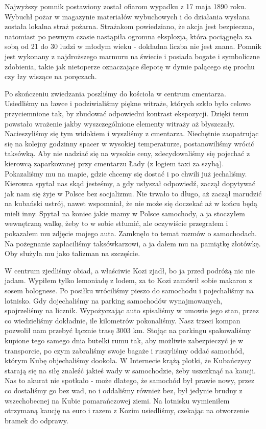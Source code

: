 Najwyższy pomnik postawiony został ofiarom wypadku z 17 maja 1890 roku.
Wybuchł pożar w magazynie materiałów wybuchowych i do działania wysłana została lokalna straż pożarna.
Strażakom powiedziano, że akcja jest bezpieczna, natomiast po pewnym czasie nastąpiła ogromna eksplozja, która pociągnęła za sobą od 21 do 30 ludzi w młodym wieku - dokładna liczba nie jest znana.
Pomnik jest wykonany z najdroższego marmuru na świecie i posiada bogate i symboliczne zdobienia, takie jak nietoperze oznaczające ślepotę w dymie palącego się prochu czy łzy wiszące na poręczach.
\par Po skończeniu zwiedzania poszliśmy do kościoła w centrum cmentarza.
Usiedliśmy na ławce i podziwialiśmy piękne witraże, których szkło było celowo przyciemnione tak, by zbudować odpowiedni kontrast ekspozycji.
Dzięki temu powstało wrażenie jakby wyszczególnione elementy witraży aż błyszczały.
Nacieszyliśmy się tym widokiem i wyszliśmy z cmentarza.
Niechętnie zaopatrując się na kolejny godzinny spacer w wysokiej temperaturze, postanowiliśmy wrócić taksówką.
Aby nie nadziać się na wysokie ceny, zdecydowaliśmy się pojechać z kierowcą zaparkowanej przy cmentarzu Łady (z logiem taxi za szybą).
Pokazaliśmy mu na mapie, gdzie chcemy się dostać i po chwili już jechaliśmy.
Kierowca spytał nas skąd jesteśmy, a gdy usłyszał odpowiedź, zaczął dopytywać jak nam się żyje w Polsce bez socjalizmu.
Nie trwało to długo, aż zaczął marudzić na kubański ustrój, nawet wspomniał, że nie może się doczekać aż w końcu będą mieli inny.
Spytał na koniec jakie mamy w Polsce samochody, a ja stoczyłem wewnętrzną walkę, żeby to w sobie stłumić, ale oczywiście przegrałem i pokazałem mu zdjęcie mojego auta.
Zamknęło to temat rozmów o samochodach.
Na pożegnanie zapłaciliśmy taksówkarzowi, a ja dałem mu na pamiątkę złotówkę.
Oby służyła mu jako talizman na szczęście.
\par W centrum zjedliśmy obiad, a właściwie Kozi zjadł, bo ja przed podróżą nic nie jadam.
Wypiłem tylko lemoniadę z lodem, za to Kozi zamówił sobie makaron z sosem bolognese.
Po posiłku wróciliśmy pieszo do samochodu i pojechaliśmy na lotnisko.
Gdy dojechaliśmy na parking samochodów wynajmowanych, spojrzeliśmy na licznik. Wypożyczając auto spisaliśmy w umowie jego stan, przez co wiedzieliśmy dokładnie, ile kilometrów pokonaliśmy. Nasz trzeci kompan pozwolił nam przebyć łącznie trasę 3003 km.
Stojąc na parkingu spakowaliśmy kupione tego samego dnia butelki rumu tak, aby możliwie zabezpieczyć je w transporcie, po czym zabraliśmy swoje bagaże i ruszyliśmy oddać samochód, którym Kubę objechaliśmy dookoła.
W Internecie krążą plotki, że Kubańczycy starają się na siłę znaleźć jakieś wady w samochodzie, żeby uszczknąć na kaucji.
Nas to akurat nie spotkało - może dlatego, że samochód był prawie nowy, przez co dostaliśmy go bez wad, no i oddaliśmy również bez, był jedynie brudny z wszechobecnej na Kubie pomarańczowej ziemi.
Na lotnisku wymieniłem otrzymaną kaucję na euro i razem z Kozim usiedliśmy, czekając na otworzenie bramek do odprawy.